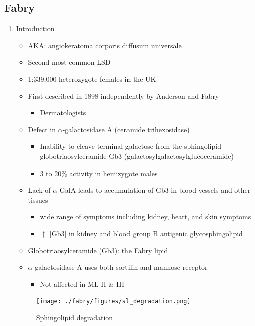 \documentclass{scrartcl}
\begin{document}
\subsection{Fabry}
\label{sec:org5bcc5ff}
\begin{enumerate}
\item Introduction
\label{sec:org15bef8b}
\begin{itemize}
\item AKA: angiokeratoma corporis diffusum universale
\item Second most common LSD
\item 1:339,000 heterozygote females in the UK
\item First described in 1898 independently by Anderson and Fabry
\begin{itemize}
\item Dermatologists
\end{itemize}
\item Defect in \(\alpha\)-galactosidase A (ceramide trihexosidase)
\begin{itemize}
\item Inability to cleave terminal galactose from the sphingolipid globotriaosylceramide Gb3 (galactosylgalactosylglucoceramide)
\item 3 to 20\% activity in hemizygote males
\end{itemize}
\item Lack of \(\alpha\)-GalA leads to accumulation of Gb3 in blood vessels and other tissues
\begin{itemize}
\item wide range of symptoms including kidney, heart, and skin symptoms
\item \(\uparrow\) [Gb3] in kidney and blood group B antigenic glycosphingolipid
\end{itemize}
\item Globotriaosylceramide (Gb3): the Fabry lipid
\item \(\alpha\)-galactosidase A uses both sortilin and mannose receptor
\begin{itemize}
\item Not affected in ML II \& III
\end{itemize}
\end{itemize}

\begin{figure}[htbp]
\centering
\texttt{[image: ./fabry/figures/sl\_degradation.png]}
\caption[Sphingolipid degradation]{\label{fig:org80e2890}
Sphingolipid degradation}
\end{figure}



\end{enumerate}
\end{document}
